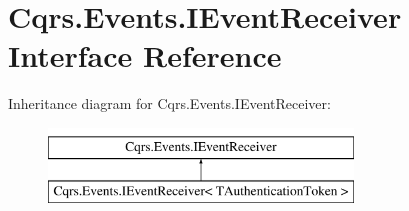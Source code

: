 \hypertarget{interfaceCqrs_1_1Events_1_1IEventReceiver}{}\section{Cqrs.\+Events.\+I\+Event\+Receiver Interface Reference}
\label{interfaceCqrs_1_1Events_1_1IEventReceiver}
Inheritance diagram for Cqrs.\+Events.\+I\+Event\+Receiver\+:\begin{figure}[H]
\begin{center}
\leavevmode
\includegraphics[height=2.000000cm]{interfaceCqrs_1_1Events_1_1IEventReceiver}
\end{center}
\end{figure}
